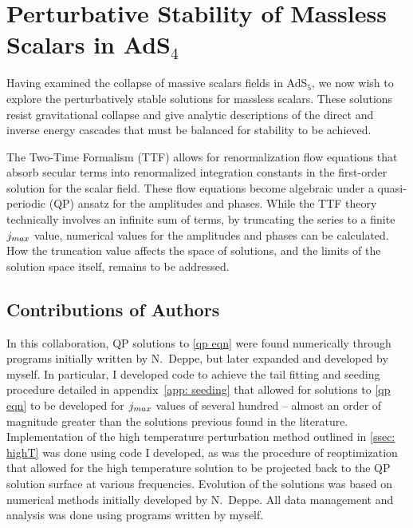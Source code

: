 \documentclass[../PhD.tex]{subfiles}
\begin{document}

\chapter{Perturbative Stability of Massless Scalars in AdS$_4$}
\label{ch: ttf}

Having examined the collapse of massive scalars fields in AdS$_5$, we now wish to explore the perturbatively stable solutions for massless scalars. These solutions resist gravitational collapse and give analytic descriptions of the direct and inverse energy cascades that must be balanced for stability to be achieved. 

The Two-Time Formalism (TTF) allows for renormalization flow equations that absorb secular terms into renormalized integration constants in the first-order solution for the scalar field. These flow equations become algebraic under a quasi-periodic (QP) ansatz for the amplitudes and phases. While the TTF theory technically involves an infinite sum of terms, by truncating the series to a finite $j_{max}$ value, numerical values for the amplitudes and phases can be calculated. How the truncation value affects the space of solutions, and the limits of the solution space itself, remains to be addressed.

\section{Contributions of Authors}

In this collaboration, QP solutions to \eqref{qp eqn} were found numerically through programs initially written by N.~Deppe, but later expanded and developed by myself. In particular, I developed code to achieve the tail fitting and seeding procedure detailed in appendix~\ref{app: seeding} that allowed for solutions to \eqref{qp eqn} to be developed for $j_{max}$ values of several hundred -- almost an order of magnitude greater than the solutions previous found in the literature. Implementation of the high temperature perturbation method outlined in \ref{ssec: highT} was done using code I developed, as was the procedure of reoptimization that allowed for the high temperature solution to be projected back to the QP solution surface at various frequencies. Evolution of the solutions was based on numerical methods initially developed by N.~Deppe. All data management and analysis was done using programs written by myself.
\end{document}
